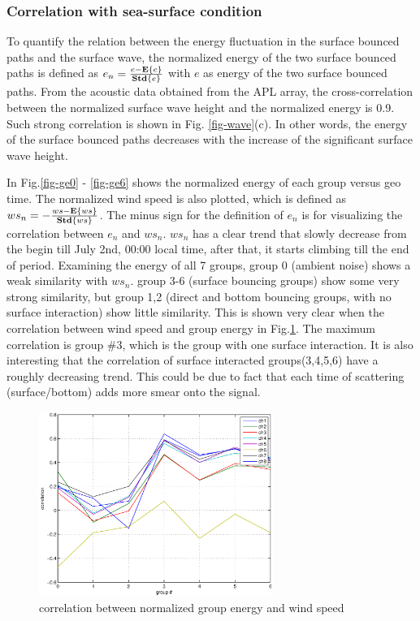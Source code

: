 \subsubsection{Correlation with sea-surface condition}
To quantify the relation between the energy fluctuation in the
surface bounced paths and the surface wave, the normalized energy of
the two surface bounced paths is defined as $e_n=\frac{e-{\bf
E}\{e\}}{{\bf Std}\{e\}}$ with $e$ as energy of the two surface
bounced paths. From the acoustic data obtained from the APL array,
the cross-correlation between the normalized surface wave height and
the normalized energy is 0.9. Such strong correlation is shown in
Fig. \ref{fig-wave}(c). In other words, the energy of the surface
bounced paths decreases with the increase of the significant surface
wave height.

In Fig.\ref{fig-ge0} - \ref{fig-ge6} shows the normalized energy of
each group versus geo time. The normalized wind speed is also
plotted, which is defined as $ws_n=-\frac{ws-{\bf E}\{ws\}}{{\bf
Std}\{ws\}}$. The minus sign for the definition of $e_n$ is for
visualizing the correlation between $e_n$ and $ws_n$. $ws_n$ has a
clear trend that slowly decrease from the begin till July 2nd, 00:00
local time, after that, it starts climbing till the end of period.
Examining the energy of all 7 groups, group 0 (ambient noise) shows
a weak similarity with $ws_n$. group 3-6 (surface bouncing groups)
show some very strong similarity, but group 1,2 (direct and bottom
bouncing groups, with no surface interaction) show little
similarity. This is shown very clear when the correlation between
wind speed and group energy in Fig.\ref{fig-corr_w}. The maximum
correlation is group \#3, which is the group with one surface
interaction. It is also interesting that the correlation of surface
interacted groups(3,4,5,6) have a roughly decreasing trend. This
could be due to fact that each time of scattering (surface/bottom)
adds more smear onto the signal.
\begin{figure}
\begin{center}
\includegraphics[width=3in]{correlation_energy_wind.eps}
\caption{\normalsize correlation between normalized group energy and
wind speed }\label{fig-corr_w}
\end{center}
\end{figure}

